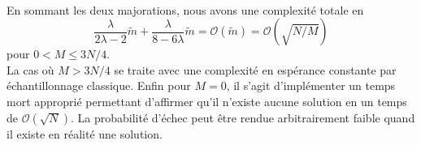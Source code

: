 \\
En sommant les deux majorations, nous avons une complexité totale en
\[\frac{\lambda}{2\lambda-2}\tilde{m} + \frac{\lambda}{8-6\lambda}\tilde{m} = \mathcal{O}(\tilde{m}) = \mathcal{O}(\sqrt{N/M})\] pour $0<M \leq 3N/4$.
\\
La cas où $M > 3N/4$ se traite avec une complexité en espérance constante par échantillonnage classique. Enfin pour $M = 0$, il s'agit d'implémenter un temps mort approprié permettant d'affirmer qu'il n'existe aucune solution en un temps de $\mathcal{O}(\sqrt{N})$. La probabilité d'échec peut être rendue arbitrairement faible quand il existe en réalité une solution. 